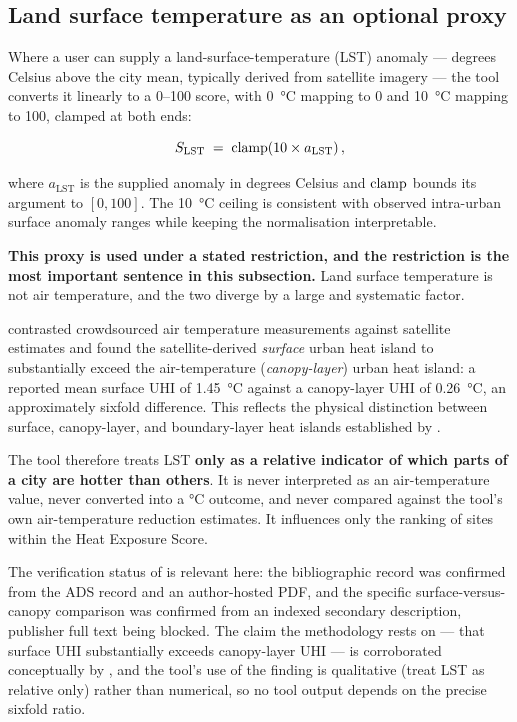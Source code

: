 \subsection{Land surface temperature as an optional proxy}
\label{sec:lst}

Where a user can supply a land-surface-temperature (LST) anomaly --- degrees
Celsius above the city mean, typically derived from satellite imagery --- the
tool converts it linearly to a \numrange{0}{100} score, with
\qty{0}{\degreeCelsius} mapping to 0 and \qty{+10}{\degreeCelsius} mapping to
100, clamped at both ends:

\begin{equation}
\label{eq:lst}
S_{\mathrm{LST}} \;=\; \operatorname{clamp}\!\left(10 \times a_{\mathrm{LST}}\right),
\end{equation}

where $a_{\mathrm{LST}}$ is the supplied anomaly in degrees Celsius and
$\operatorname{clamp}$ bounds its argument to $[0, 100]$. The \qty{10}{\degreeCelsius}
ceiling is consistent with observed intra-urban surface anomaly ranges while
keeping the normalisation interpretable.

\begin{keynote}
\noindent\textbf{This proxy is used under a stated restriction, and the
restriction is the most important sentence in this subsection.} Land surface
temperature is not air temperature, and the two diverge by a large and
systematic factor.

\textcite{venter2021} contrasted crowdsourced air temperature measurements
against satellite estimates and found the satellite-derived \emph{surface}
urban heat island to substantially exceed the air-temperature
(\emph{canopy-layer}) urban heat island: a reported mean surface UHI of
\qty{1.45}{\degreeCelsius} against a canopy-layer UHI of
\qty{0.26}{\degreeCelsius}, an approximately sixfold difference. This reflects
the physical distinction between surface, canopy-layer, and boundary-layer heat
islands established by \textcite{oke1976}.

The tool therefore treats LST \textbf{only as a relative indicator of which
parts of a city are hotter than others}. It is never interpreted as an
air-temperature value, never converted into a \si{\degreeCelsius} outcome, and
never compared against the tool's own air-temperature reduction estimates. It
influences only the ranking of sites within the Heat Exposure Score.
\end{keynote}

The verification status of \textcite{venter2021} is relevant here: the
bibliographic record was confirmed from the ADS record and an author-hosted
PDF, and the specific surface-versus-canopy comparison was confirmed from an
indexed secondary description, publisher full text being blocked. The claim the
methodology rests on --- that surface UHI substantially exceeds canopy-layer
UHI --- is corroborated conceptually by \textcite{oke1976}, and the tool's use
of the finding is qualitative (treat LST as relative only) rather than
numerical, so no tool output depends on the precise sixfold ratio.


